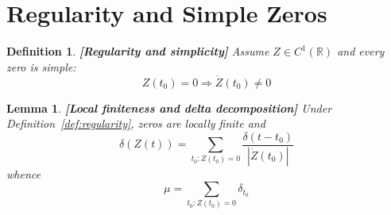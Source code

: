 \documentclass{article}
\newcommand{\tmstrong}[1]{\textbf{#1}}
\newtheorem{definition}{Definition}
\newtheorem{lemma}{Lemma}
\begin{document}
\section{Regularity and Simple Zeros}\label{sec:appendix}

\begin{definition}
  {\tmstrong{[Regularity and simplicity]\label{def:regularity}}} Assume $Z \in
  C^1 (\mathbb{R})$ and every zero is simple:
  \begin{equation}
    Z (t_0) = 0 \Rightarrow \dot{Z} (t_0) \neq 0
  \end{equation}
\end{definition}

\begin{lemma}
  {\tmstrong{[Local finiteness and delta decomposition]\label{lem:delta}
  }}Under Definition~\ref{def:regularity}, zeros are locally finite and
  \begin{equation}
    \delta (Z (t)) = \sum_{t_0 : Z (t_0) = 0} \frac{\delta (t - t_0)}{|
    \dot{Z} (t_0) |}
  \end{equation}
  whence
  \begin{equation}
    \mu = \sum_{t_0 : Z (t_0) = 0} \delta_{t_0}
  \end{equation}
\end{lemma}
\end{document}
